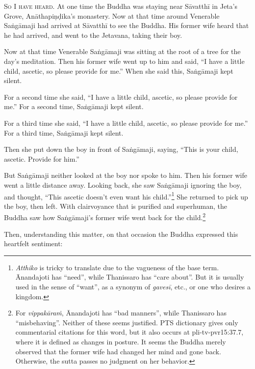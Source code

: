 \documentclass[12pt,openany]{book}%
\newcommand*{\scevam}[1]{\textsc{#1}}
\begin{document}
\scevam{So I have heard. }At one time the Buddha was staying near \textsanskrit{Sāvatthī} in Jeta’s Grove, \textsanskrit{Anāthapiṇḍika}’s monastery. Now at that time around Venerable \textsanskrit{Saṅgāmaji} had arrived at \textsanskrit{Sāvatthī} to see the Buddha. His former wife heard that he had arrived, and went to the Jetavana, taking their boy. 

Now at that time Venerable \textsanskrit{Saṅgāmaji} was sitting at the root of a tree for the day’s meditation. Then his former wife went up to him and said, “I have a little child, ascetic, so please provide for me.” When she said this, \textsanskrit{Saṅgāmaji} kept silent. 

For a second time she said, “I have a little child, ascetic, so please provide for me.” For a second time, \textsanskrit{Saṅgāmaji} kept silent. 

For a third time she said, “I have a little child, ascetic, so please provide for me.” For a third time, \textsanskrit{Saṅgāmaji} kept silent. 

Then she put down the boy in front of \textsanskrit{Saṅgāmaji}, saying, “This is your child, ascetic. Provide for him.” 

But \textsanskrit{Saṅgāmaji} neither looked at the boy nor spoke to him. Then his former wife went a little distance away. Looking back, she saw \textsanskrit{Saṅgāmaji} ignoring the boy, and thought, “This ascetic doesn’t even want his child.”\footnote{\textit{Atthiko} is tricky to translate due to the vagueness of the base term. Ānandajoti has “need”, while Thanissaro has “care about”. But it is usually used in the sense of “want”, as a synonym of \textit{\textsanskrit{gavesī}}, etc., or one who desires a kingdom. } She returned to pick up the boy, then left. With clairvoyance that is purified and superhuman, the Buddha saw how \textsanskrit{Saṅgāmaji}’s former wife went back for the child.\footnote{For \textit{\textsanskrit{vippakāraṁ}}, Ānandajoti has “bad manners”, while Thanissaro has “misbehaving”. Neither of these seems justified. PTS dictionary gives only commentarial citations for this word, but it also occurs at pli-tv-pvr15:37.7, where it is defined as changes in posture. It seems the Buddha merely observed that the former wife had changed her mind and gone back. Otherwise, the sutta passes no judgment on her behavior. } 

Then, understanding this matter, on that occasion the Buddha expressed this heartfelt sentiment: 
\end{document}
